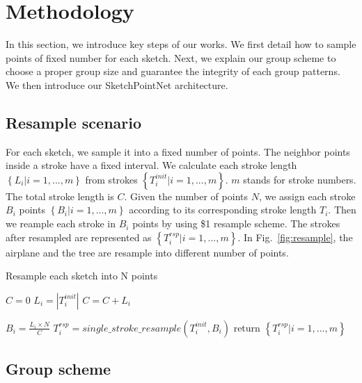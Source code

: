 \section{Methodology}
\label{sec:methodology}

In this section, we introduce key steps of our works. We first detail how to sample points of fixed number for each sketch. Next, we explain our group scheme to choose a proper group size and guarantee the integrity of each group patterns. We then introduce our SketchPointNet architecture.

\subsection{Resample scenario}
\label{ssec:resample_scenario}

For each sketch, we sample it into a fixed number of points. The neighbor points inside a stroke have a fixed interval. We calculate each stroke length $\left\{ L_i| i = 1, ..., m \right\}$ from strokes $\left\{ T_i^{init}| i = 1, ..., m \right\}$. $m$ stands for stroke numbers. The total stroke length is $C$. Given the number of points $N$, we assign each stroke $B_i$ points $\left\{ B_i| i = 1, ..., m \right\}$ according to its corresponding stroke length $T_i$. Then we reample each stroke in $B_i$ points by using \$1 \cite{Wobbrock2007GesturesWL} resample scheme. The strokes after resampled are represented as $\left\{ T_i^{rsp}| i = 1, ..., m \right\}$. In Fig.~\ref{fig:resample}, the airplane and the tree are resample into different number of points.
\begin{algorithm}[h]
\label{alg:resample}
    \caption{Resample each sketch into N points}
    $C = 0$\;
    {
        $L_i = |T_i^{init}|$\;
        $C = C + L_i$\;
    }

    {
        $B_i = \frac{L_i \times N}{C}$\;
        $T_i^{rsp} = single\_stroke\_resample(T_i^{init}, B_i)$\;
    }
    return $\left\{ T_i^{rsp}| i = 1, ..., m \right\}$\;
\end{algorithm}



\subsection{Group scheme}
\label{ssec:group_scheme}

